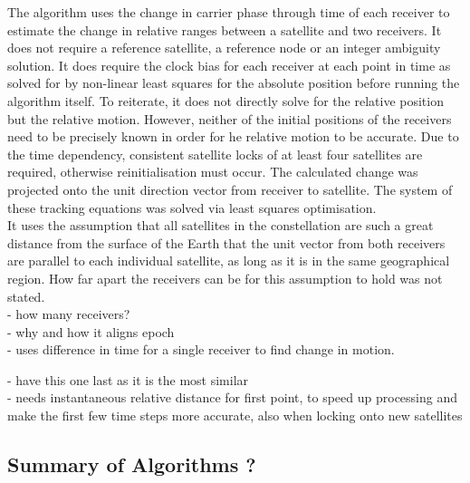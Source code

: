 The algorithm uses the change in carrier phase through time of each receiver to estimate the change in relative ranges between a satellite and two receivers. It does not require a reference satellite, a reference node or an integer ambiguity solution. It does require the clock bias for each receiver at each point in time as solved for by non-linear least squares for the absolute position before running the algorithm itself. To reiterate, it does not directly solve for the relative position but the relative motion. However, neither of the initial positions of the receivers need to be precisely known in order for he relative motion to be accurate. Due to the time dependency, consistent satellite locks of at least four satellites are required, otherwise reinitialisation must occur. The calculated change was projected onto the unit direction vector from receiver to satellite. The system of these tracking equations was solved via least squares optimisation. \\

It uses the assumption that all satellites in the constellation are such a great distance from the surface of the Earth that the unit vector from both receivers are parallel to each individual satellite, as long as it is in the same geographical region. How far apart the receivers can be for this assumption to hold was not stated.\\ 




- how many receivers?\\
- why and how it aligns epoch\\
- uses difference in time for a single receiver to find change in motion.



- have this one last as it is the most similar\\
- needs instantaneous relative distance for first point, to speed up processing and make the first few time steps more accurate, also when locking onto new satellites


\subsection{Summary of Algorithms ?}

